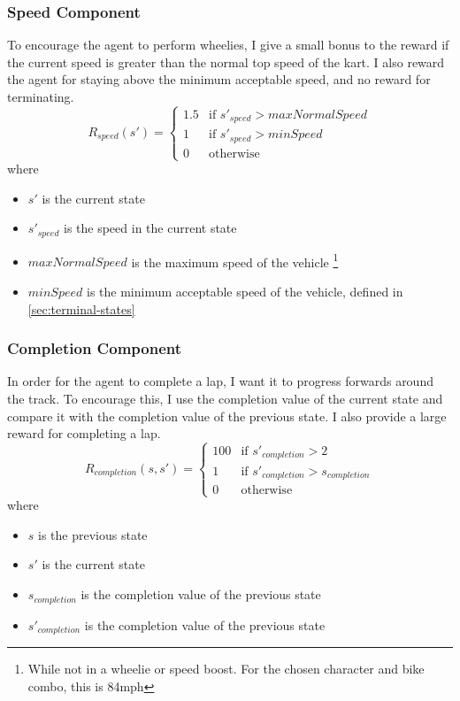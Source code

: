 \subsubsection{Speed Component}
To encourage the agent to perform wheelies, I give a small bonus to the reward if the current speed is greater than the normal top speed of the kart. I also reward the agent for staying above the minimum acceptable speed, and no reward for terminating.
\[
R_{speed}(s') = 
\begin{cases}
 1.5 & \text{if } s'_{speed} > maxNormalSpeed\\
 1 & \text{if } s'_{speed} > minSpeed\\
 0 & \text{otherwise}
\end{cases}
\]
where
\begin{itemize}
    \item $s'$ is the current state 
    \item $s'_{speed}$ is the speed in the current state
    \item $maxNormalSpeed$ is the maximum speed of the vehicle \footnote{While not in a wheelie or speed boost. For the chosen character and bike combo, this is 84mph}
    \item $minSpeed$ is the minimum acceptable speed of the vehicle, defined in \ref{sec:terminal-states}
\end{itemize}
\subsubsection{Completion Component}
In order for the agent to complete a lap, I want it to progress forwards around the track. To encourage this, I use the completion value of the current state and compare it with the completion value of the previous state. I also provide a large reward for completing a lap.
\[
R_{completion}(s, s') =
\begin{cases}
 100 & \text{if } s'_{completion} > 2\\
 1 & \text{if } s'_{completion} > s_{completion}\\
 0 & \text{otherwise}
\end{cases}
\]
where
\begin{itemize}
    \item $s$ is the previous state
    \item $s'$ is the current state
    \item $s_{completion}$ is the completion value of the previous state
    \item $s'_{completion}$ is the completion value of the previous state
\end{itemize}
